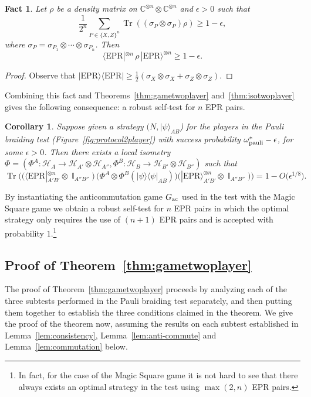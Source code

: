 \documentclass[11pt,letterpaper]{article}
\newcommand{\<}{\langle}
\renewcommand{\>}{\rangle}
\newtheorem{fact}[theorem]{Fact}
\newtheorem{corollary}[theorem]{Corollary}
\newcommand{\lemref}[1]{Lemma~\ref{lem:#1}}
\newcommand{\bra}[1]{\< #1 |}
\newcommand{\ket}[1]{| #1 \>}
\newcommand{\eps}{\epsilon}
\newcommand{\mH}{\mathcal{H}}
\DeclareMathOperator{\Id}{\mathbb{I}}
\DeclareMathOperator{\Tr}{Tr}
\newcommand{\enc}{\ensuremath{\rm pauli}}
\newcommand{\ac}{{\ensuremath{\rm ac}}}
\newcommand{\C}{\mathbb{C}}
\newcommand{\EPR}{\mathrm{EPR}}
\begin{document}
\begin{fact}
Let $\rho$ be a density matrix on $\C^{\otimes n}\otimes \C^{\otimes n}$ and $\eps > 0 $ such that 
$$ \frac{1}{2^n} \sum_{P\in\{X,Z\}^n} \Tr( (\sigma_P \otimes \sigma_P) \rho ) \geq 1-\eps,$$
where $\sigma_P = \sigma_{P_1} \otimes \cdots \otimes \sigma_{P_n}$. Then 
$$ \bra{\EPR}^{\otimes n} \,\rho\, \ket{\EPR}^{\otimes n} \geq 1-\eps.$$
\end{fact}

\begin{proof}
Observe that $\ket{\EPR}\bra{\EPR} \geq \frac{1}{2}(\sigma_X\otimes \sigma_X + \sigma_Z \otimes \sigma_Z)$. 
\end{proof}

Combining this fact and Theorems~\ref{thm:gametwoplayer}
and~\ref{thm:isotwoplayer} gives the following consequence: a robust self-test for $n$ EPR
pairs.

\begin{corollary}\label{cor:epr-test}
  Suppose given a strategy $(N,\ket{\psi}_{AB}$) for the players in the Pauli braiding test (Figure~\ref{fig:protocol2player}) with success probability $\omega^*_{\enc} - \eps$, for some $\eps>0$. Then
  there exists a local isometry $\Phi = (\Phi^A:\mH_A\to\mH_{A'}\otimes \mH_{A''},\Phi^B:\mH_B\to\mH_{B'}\otimes \mH_{B''})$ such that 
  $$\Tr\Big( \big(\bra{\EPR}_{A'B'}^{\otimes
      n}\otimes \Id_{A''B''}\big)\,\big( \Phi^A \otimes \Phi^B(\ket{\psi}\bra{\psi}_{AB})\big)\big( \ket{\EPR}_{A'B'}^{\otimes n} \otimes \Id_{A''B''}\big) \Big) = 1 - O\big(\eps^{1/8}\big).$$
\end{corollary}

By instantiating the anticommutation game $G_\ac$ used in the test with the Magic Square game we obtain a robust self-test for $n$ EPR pairs in which the optimal strategy only requires the use of $(n+1)$ EPR pairs and is accepted with probability $1$.\footnote{In fact, for the case of the Magic Square game it is not hard to see that there always exists an optimal strategy in the test using $\max(2,n)$ EPR pairs.}

\subsection{Proof of Theorem~\ref{thm:gametwoplayer}}
\label{sec:gametwoplayer}

The proof of Theorem~\ref{thm:gametwoplayer} proceeds by analyzing each of the three subtests performed in the Pauli braiding test separately, and then putting them together to establish the three conditions claimed in the theorem. We give the proof of the theorem now, assuming the results on each subtest established in \lemref{consistency}, \lemref{anti-commute} and \lemref{commutation} below. 
\end{document}
